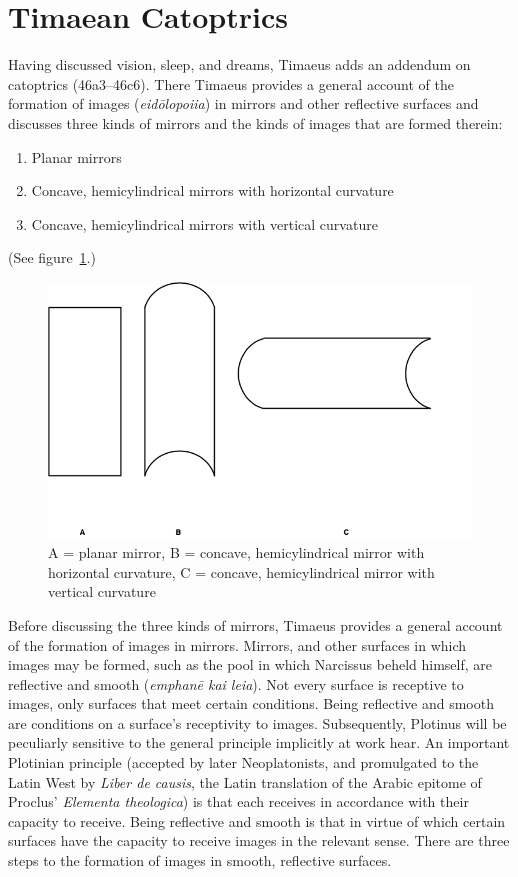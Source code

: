 
\section{Timaean Catoptrics} %
\label{sec:timaen_catoptrics}

Having discussed vision, sleep, and dreams, Timaeus adds an addendum on catoptrics (46a3–46c6). There Timaeus provides a general account of the formation of images (\emph{eidōlopoiia}) in mirrors and other reflective surfaces and discusses three kinds of mirrors and the kinds of images that are formed therein:
\begin{enumerate}[(1)]
	\item Planar mirrors
	\item Concave, hemicylindrical mirrors with horizontal curvature
	\item Concave, hemicylindrical mirrors with vertical curvature
\end{enumerate}
(See figure~\ref{fig:mirror_type}.)

\begin{figure}[htbp]
	\centering
		\includegraphics[scale=0.4]{graphics/mirror_type.png}
	\caption{A = planar mirror, B = concave, hemicylindrical mirror with horizontal curvature, C = concave, hemicylindrical mirror with vertical curvature}
	\label{fig:mirror_type}
\end{figure}

Before discussing the three kinds of mirrors, Timaeus provides a general account of the formation of images in mirrors. Mirrors, and other surfaces in which images may be formed, such as the pool in which Narcissus beheld himself, are reflective and smooth (\emph{emphanē kai leia}). Not every surface is receptive to images, only surfaces that meet certain conditions. Being reflective and smooth are conditions on a surface's receptivity to images. Subsequently, Plotinus will be peculiarly sensitive to the general principle implicitly at work hear. An important Plotinian principle (accepted by later Neoplatonists, and promulgated to the Latin West by \emph{Liber de causis}, the Latin translation of the Arabic epitome of Proclus' \emph{Elementa theologica}) is that each receives in accordance with their capacity to receive. Being reflective and smooth is that in virtue of which certain surfaces have the capacity to receive images in the relevant sense. There are three steps to the formation of images in smooth, reflective surfaces. 

